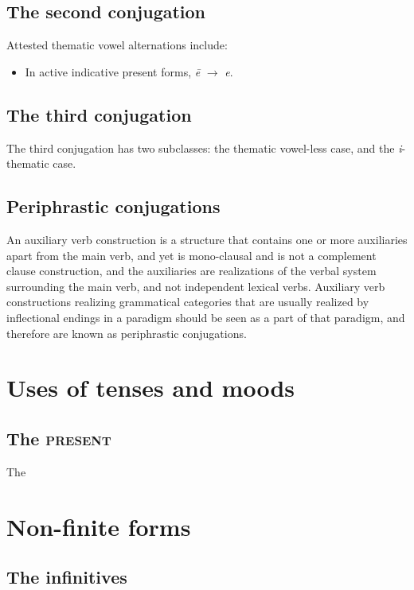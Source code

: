 \documentclass[a4paper, oneside, 12pt]{report}
\newcommand{\form}[1]{\emph{#1}}
\newcommand*{\category}[1]{\textsc{#1}}
\begin{document}
\subsection{The second conjugation}\label{sec:verb-morphology.2c}

Attested thematic vowel alternations include:
\begin{itemize}
    \item In active indicative present forms, \form{\={e}} $\to$ \form{e}.
\end{itemize}

\subsection{The third conjugation}

The third conjugation has two subclasses:
the thematic vowel-less case, 
and the \form{i}-thematic case.

\subsection{Periphrastic conjugations}

An auxiliary verb construction is a structure 
that contains one or more auxiliaries apart from the main verb, 
and yet is mono-clausal and is not a complement clause construction,
and the auxiliaries are realizations of the verbal system 
surrounding the main verb, and not independent lexical verbs.
Auxiliary verb constructions realizing grammatical categories 
that are usually realized by inflectional endings in a paradigm
should be seen as a part of that paradigm,
and therefore are known as periphrastic conjugations.

\section{Uses of tenses and moods}\label{sec:verb.tense-usage}

\subsection{The \category{present}}

The

\section{Non-finite forms}

\subsection{The infinitives}\label{sec:infinitives}
\end{document}

